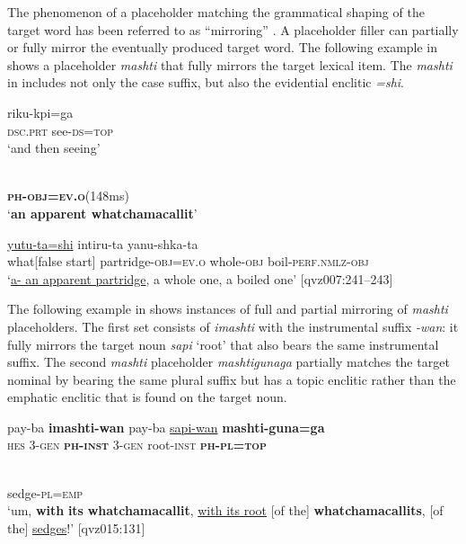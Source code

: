 \documentclass[output=paper]{langscibook}
\begin{document}
The phenomenon of a placeholder matching the grammatical shaping of the target word has been referred to as “mirroring” \citep[18]{Podlesskaya2010}. A placeholder filler can partially or fully mirror the eventually produced target word. The following example in  shows a placeholder \textit{mashti} that fully mirrors the target lexical item. The \textit{mashti} in  includes not only the case suffix, but also the evidential enclitic \textit{=shi}.

\ea%
\label{ex:rice:8}
\ea  \label{ex:rice:8a}      {riku-kpi=ga}\\
{\textsc{dsc.prt}}  {see-\textsc{ds=top}}\\
\glt ‘and then seeing’
\medskip

\ex \label{ex:rice:8b}  \\
{\textbf{\textsc{ph-obj=ev.o}}\textsc{(148}ms)}\\
\glt ‘{\textbf{an apparent whatchamacallit}}’
\medskip

\ex  \label{ex:rice:8c}  {\uline{yutu-ta=shi}} {intiru-ta} {yanu-shka-ta}\\
{what[false start]}  {{partridge-\textsc{obj=ev.o}}}  {whole-\textsc{obj}} {boil-\textsc{perf.nmlz-obj}}\\
\glt ‘\uline{a- an apparent partridge}, a whole one, a boiled one’ [qvz007:241--243]
\z
\z

The following example in  shows instances of full and partial mirroring of \textit{mashti} placeholders. The first set consists of \textit{imashti} with the instrumental suffix \textit{{}-wan}: it fully mirrors the target noun \textit{sapi} ‘root’ that also bears the same instrumental suffix. The second \textit{mashti} placeholder \textit{mashtigunaga} partially matches the target nominal by bearing the same plural suffix but has a topic enclitic rather than the emphatic enclitic that is found on the target noun.       

\ea%
\label{ex:rice:9}
  {pay-ba} {\textbf{imashti-wan}} {pay-ba}  {\uline{sapi-wan}} {\textbf{mashti-guna=ga}} \\
{\textsc{hes}} {3-\textsc{gen}} {\textbf{\textsc{ph-inst}}} {3-\textsc{gen}}  {root-\textsc{inst}} {\textbf{\textsc{ph-pl=top}}} \\
\medskip

\\
{sedge-\textsc{pl=emp}}\\
\glt  ‘um, \textbf{with} \textbf{its} \textbf{whatchamacallit}, \uline{with its root} [of the] \textbf{whatchamacallits}, [of the] \uline{sedges}!’ [qvz015:131]
\z
\end{document}
